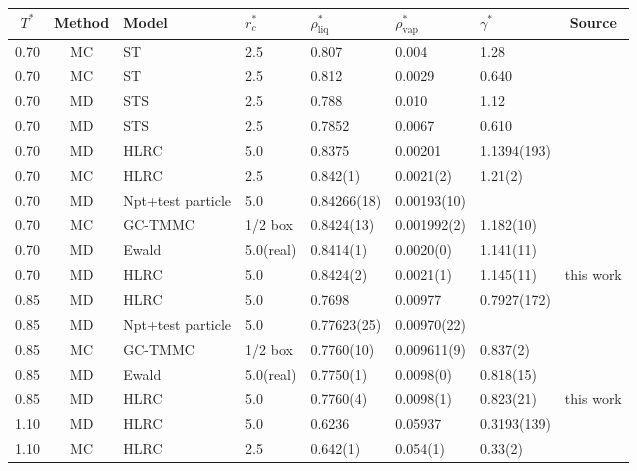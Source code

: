 \documentclass[aps,pre,preprint]{revtex4}
\begin{document}
\begin{table}
  \centering
  \begin{tabular*}{0.99\textwidth}{@{\extracolsep{\fill}}cclllllc}\hline\hline
    $T^\ast$ & Method & Model & $r_c^\ast$ & $\rho^\ast_{\textrm{liq}}$ & $\rho^\ast_{\textrm{vap}}$ & $\gamma^\ast$ & Source \\\hline
    0.70 & MC & ST & 2.5 & 0.807 & 0.004  & 1.28  & \cite{chapela1977computer}\\
    0.70 & MC & ST & 2.5 & 0.812 & 0.0029 & 0.640 & \cite{trokhymchuk1999computer} \\
    0.70 & MD & STS& 2.5 & 0.788 & 0.010  & 1.12  & \cite{chapela1977computer}\\
    0.70 & MD & STS& 2.5 & 0.7852 & 0.0067 & 0.610 & \cite{trokhymchuk1999computer}\\
    0.70 & MD & HLRC & 5.0 & 0.8375 & 0.00201 & 1.1394(193) & \cite{mecke1997molecular}\\
    0.70 & MC & HLRC & 2.5 & 0.842(1) & 0.0021(2) & 1.21(2) & \cite{janecek2006long}\\
    0.70 & MD & Npt+test particle & 5.0 & 0.84266(18) & 0.00193(10) & & \cite{lotfi1992vapour}\\
    0.70 & MC & GC-TMMC & 1/2 box & 0.8424(13) & 0.001992(2) & 1.182(10) & \cite{errington2003evaluating}\\
    0.70 & MD & Ewald & 5.0(real) & 0.8414(1) & 0.0020(0) & 1.141(11) & \cite{ismail2007application}\\
    0.70 & MD & HLRC & 5.0 & 0.8424(2) & 0.0021(1) & 1.145(11) & this work\\\hline
    0.85 & MD & HLRC & 5.0 & 0.7698 & 0.00977 & 0.7927(172) & \cite{mecke1997molecular}\\
    0.85 & MD & Npt+test particle & 5.0 & 0.77623(25) & 0.00970(22) & & \cite{lotfi1992vapour}\\
    0.85 & MC & GC-TMMC & 1/2 box & 0.7760(10) & 0.009611(9) & 0.837(2) & \cite{errington2003evaluating}\\
    0.85 & MD & Ewald & 5.0(real) & 0.7750(1) & 0.0098(0) & 0.818(15) & \cite{ismail2007application}\\
    0.85 & MD & HLRC & 5.0 & 0.7760(4) & 0.0098(1) & 0.823(21) & this work\\\hline
    1.10 & MD & HLRC & 5.0 & 0.6236 & 0.05937 & 0.3193(139) & \cite{mecke1997molecular}\\
    1.10 & MC & HLRC & 2.5 & 0.642(1) & 0.054(1) & 0.33(2) & \cite{janecek2006long}\\

\end{tabular*}
\end{table}
\end{document}
